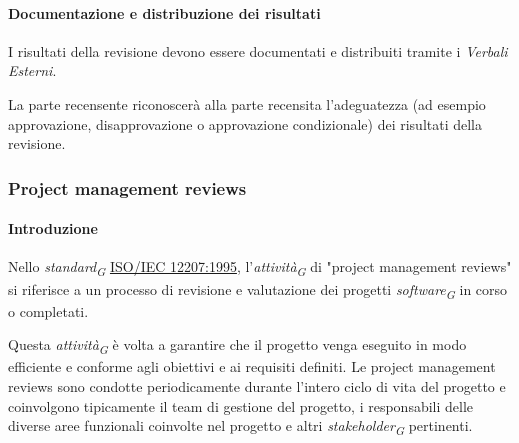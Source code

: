 
\paragraph{Documentazione e distribuzione dei risultati}
I risultati della revisione devono essere documentati e distribuiti tramite i \textit{Verbali Esterni}.

La parte recensente riconoscerà alla parte recensita l'adeguatezza (ad esempio approvazione, disapprovazione o approvazione condizionale) dei risultati della revisione. 

\subsubsection{Project management reviews}

\paragraph{Introduzione}
Nello \textit{standard}\textsubscript{\textit{G}} \href{https://www.math.unipd.it/~tullio/IS-1/2009/Approfondimenti/ISO_12207-1995.pdf}{ISO/IEC 12207:1995}, l'\textit{attività}\textsubscript{\textit{G}} di "project management reviews" si riferisce a un processo di revisione e valutazione dei progetti \textit{software}\textsubscript{\textit{G}} in corso o completati.

\vspace{0.2cm}

Questa \textit{attività}\textsubscript{\textit{G}} è volta a garantire che il progetto venga eseguito in modo efficiente e conforme agli obiettivi e ai requisiti definiti.
Le project management reviews sono condotte periodicamente durante l'intero ciclo di vita del progetto e coinvolgono tipicamente il team di gestione del progetto, i responsabili delle diverse aree funzionali coinvolte nel progetto e altri \textit{stakeholder}\textsubscript{\textit{G}} pertinenti.


